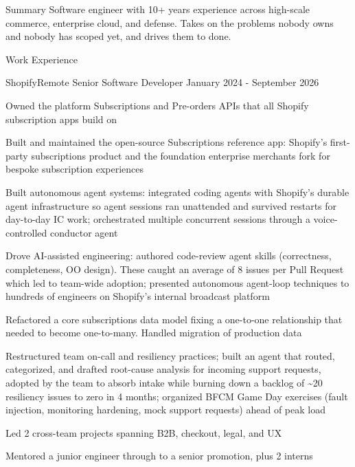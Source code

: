 \documentclass{resume} %
\begin{document}
\begin{rSection}{Summary}
Software engineer with 10+ years experience across high-scale commerce, enterprise cloud, and defense. Takes on the problems nobody owns and nobody has scoped yet, and drives them to done.
\end{rSection}

\begin{rSection}{Work Experience}

\begin{rSubsection}{Shopify}{Remote}
{Senior Software Developer}
{January 2024 - September 2026}
\item Owned the platform Subscriptions and Pre-orders APIs that all Shopify subscription apps build on
\item Built and maintained the open-source Subscriptions reference app: Shopify's first-party subscriptions product and the foundation enterprise merchants fork for bespoke subscription experiences
\item Built autonomous agent systems: integrated coding agents with Shopify's durable agent infrastructure so agent sessions ran unattended and survived restarts for day-to-day IC work; orchestrated multiple concurrent sessions through a voice-controlled conductor agent
\item Drove AI-assisted engineering: authored code-review agent skills (correctness, completeness, OO design). These caught an average of 8 issues per Pull Request which led to team-wide adoption; presented autonomous agent-loop techniques to hundreds of engineers on Shopify's internal broadcast platform
\item Refactored a core subscriptions data model fixing a one-to-one relationship that needed to become one-to-many. Handled migration of production data
\item Restructured team on-call and resiliency practices; built an agent that routed, categorized, and drafted root-cause analysis for incoming support requests, adopted by the team to absorb intake while burning down a backlog of \textasciitilde20 resiliency issues to zero in 4 months; organized BFCM Game Day exercises (fault injection, monitoring hardening, mock support requests) ahead of peak load
\item Led 2 cross-team projects spanning B2B, checkout, legal, and UX
\item Mentored a junior engineer through to a senior promotion, plus 2 interns
\end{rSubsection}


\end{rSection}
\end{document}
